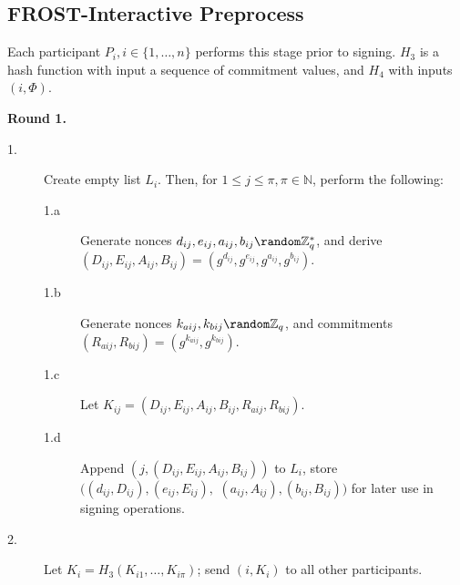 
\subsection{FROST-Interactive Preprocess}
\label{sec:interactive-protocol-preprocess}

Each participant $P_i, i \in \{1, \dots, n\}$ performs this stage prior to signing.
$H_3$ is a hash function with input a sequence of commitment values,
and $H_4$ with inputs $(i, \Phi)$.

\smallskip

\noindent \textbf{Round 1.}
\begin{description}
  \item[1.] Create empty list $L_i$. Then, for
    $1 \leq j \leq \pi, \pi \in \mathbb{N}$, perform the following:
  \begin{description}
    \item[1.a] Generate nonces $d_{ij}, e_{ij}, a_{ij}, b_{ij} \random
      \mathbb{Z}_q^*$, and
    derive $(D_{ij}, E_{ij}, \allowbreak A_{ij}, \allowbreak B_{ij}) =
    (g^{d_{ij}}, \allowbreak g^{e_{ij}}, \allowbreak g^{a_{ij}}, g^{b_{ij}})$.
    \item[1.b] Generate nonces $k_{aij}, k_{bij} \random
      \mathbb{Z}_q$, and
      commitments $(R_{aij}, R_{bij}) =
    (g^{k_{aij}}, g^{k_{bij}})$.
    \item[1.c] Let $K_{ij} = (D_{ij}, E_{ij}, A_{ij}, B_{ij},
      R_{aij}, R_{bij})$.
    \item[1.d ]Append $(j, (D_{ij}, E_{ij}, A_{ij}, B_{ij}))$ to $L_i$, store
      $((d_{ij}, D_{ij}), (e_{ij}, E_{ij}),$
      $(a_{ij}, A_{ij}), \allowbreak (b_{ij}, \allowbreak B_{ij}))$ for later use in signing
      operations.
  \end{description}
\item[2.] Let $K_i = H_3(K_{i1}, \dots, K_{i\pi})$; send $(i, K_i)$ to all
  other participants.
\end{description}

